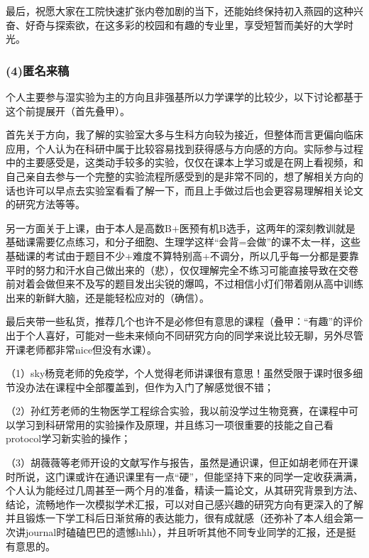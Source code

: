 \documentclass[11pt,oneside]{book}
\begin{document}
最后，祝愿大家在工院快速扩张内卷加剧的当下，还能始终保持初入燕园的这种兴奋、好奇与探索欲，在这多彩的校园和有趣的专业里，享受短暂而美好的大学时光。

\subsubsection{(4)匿名来稿}

个人主要参与湿实验为主的方向且非强基所以力学课学的比较少，以下讨论都基于这个前提展开（首先叠甲）。

\vspace{10pt}

首先关于方向，我了解的实验室大多与生科方向较为接近，但整体而言更偏向临床应用，个人认为在科研中属于比较容易找到获得感与方向感的方向。实际参与过程中的主要感受是，这类动手较多的实验，仅仅在课本上学习或是在网上看视频，和自己亲自去参与一个完整的实验流程所感受到的是非常不同的，想了解相关方向的话也许可以早点去实验室看看了解一下，而且上手做过后也会更容易理解相关论文的研究方法等等。

\vspace{10pt}

另一方面关于上课，由于本人是高数B+医预有机B选手，这两年的深刻教训就是基础课需要亿点练习，和分子细胞、生理学这样“会背=会做”的课不太一样，这些基础课的考试由于题目不少+难度不算特别高+不调分，所以几乎每一分都是要靠平时的努力和汗水自己做出来的（悲），仅仅理解完全不练习可能直接导致在交卷前对着会做但来不及写的题目发出尖锐的爆鸣，不过相信小灯们带着刚从高中训练出来的新鲜大脑，还是能轻松应对的（确信）。

\vspace{10pt}

最后夹带一些私货，推荐几个也许不是必修但有意思的课程（叠甲：“有趣”的评价出于个人喜好，可能对一些未来倾向不同研究方向的同学来说比较无聊，另外尽管开课老师都非常nice但没有水课）。

\vspace{10pt}

（1）sky杨竞老师的免疫学，个人觉得老师讲课很有意思！虽然受限于课时很多细节没办法在课程中全部覆盖到，但作为入门了解感觉很不错；

\vspace{10pt}

（2）孙红芳老师的生物医学工程综合实验，我以前没学过生物竞赛，在课程中可以学习到科研常用的实验操作及原理，并且练习一项很重要的技能之自己看protocol学习新实验的操作；

\vspace{10pt}

（3）胡薇薇等老师开设的文献写作与报告，虽然是通识课，但正如胡老师在开课时所说，这门课或许在通识课里有一点“硬”，但能坚持下来的同学一定收获满满，个人认为能经过几周甚至一两个月的准备，精读一篇论文，从其研究背景到方法、结论，流畅地作一次模拟学术汇报，可以对自己感兴趣的研究方向有更深入的了解并且锻炼一下学工科后日渐贫瘠的表达能力，很有成就感（还弥补了本人组会第一次讲journal时磕磕巴巴的遗憾hhh），并且听听其他不同专业同学的汇报，还是挺有意思的。
      
\end{document}
